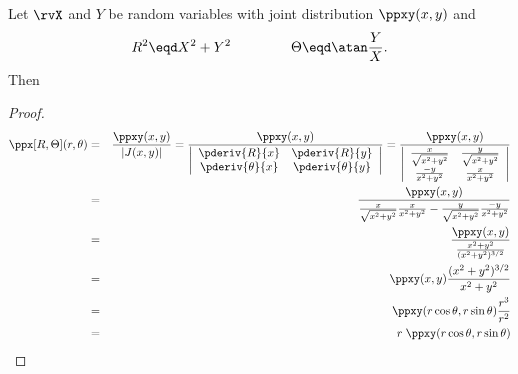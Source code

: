 \begin{proposition}
\label{prop:XY->RT}
Let $\rvX$ and $Y$ be random variables with joint distribution
$\ppxy(x,y)$ and
\[ R^2 \eqd X^2 + Y^2 \hspace{10ex} \Theta \eqd \atan\frac{Y}{X}. \]
Then
\end{proposition}
\begin{proof}
\begin{eqnarray*}
  \ppx[R,\Theta](r,\theta)
    &=& \frac{\ppxy(x,y)}{|J(x,y)|}
     =  \frac{\ppxy(x,y)}{
        \left|\begin{array}{cc}
          \pderiv{R}{x}      & \pderiv{R}{y}   \\
          \pderiv{\theta}{x} & \pderiv{\theta}{y}
        \end{array}\right|
        }
     =  \frac{\ppxy(x,y)}{
        \left|\begin{array}{cc}
          \frac{ x}{\sqrt{x^2+y^2}}  & \frac{y}{\sqrt{x^2+y^2}}   \\
          \frac{-y}{x^2+y^2}         & \frac{x}{x^2+y^2}
        \end{array}\right|
        }
  \\&=& \frac{\ppxy(x,y)}{
          \frac{x}{\sqrt{x^2+y^2}}\frac{x}{x^2+y^2}  -
          \frac{y}{\sqrt{x^2+y^2}}\frac{-y}{x^2+y^2}
        }
  \\&=& \frac{\ppxy(x,y)}{
          \frac{x^2+y^2}{(x^2+y^2)^{3/2}}
        }
  \\&=& \ppxy(x,y)\frac{(x^2+y^2)^{3/2}}{x^2+y^2}
  \\&=& \ppxy(r\cos\theta,r\sin\theta)\frac{r^3}{r^2}
  \\&=& r\;\ppxy(r\cos\theta,r\sin\theta)
\end{eqnarray*}
\end{proof}


